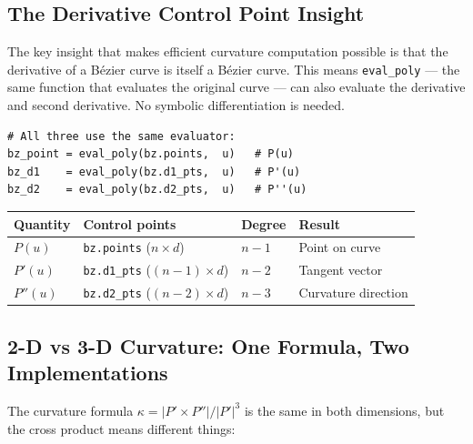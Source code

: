 \documentclass[12pt, a4paper]{article}
\newcommand{\cd}[1]{\texttt{#1}}
\begin{document}
\begin{center}
\end{center}

\subsection{The Derivative Control Point Insight}

The key insight that makes efficient curvature computation
possible is that the derivative of a B\'ezier curve is
itself a B\'ezier curve.
This means \cd{eval\_poly} --- the same function that
evaluates the original curve --- can also evaluate the
derivative and second derivative.
No symbolic differentiation is needed.

\begin{verbatim}
# All three use the same evaluator:
bz_point = eval_poly(bz.points,  u)   # P(u)
bz_d1    = eval_poly(bz.d1_pts,  u)   # P'(u)
bz_d2    = eval_poly(bz.d2_pts,  u)   # P''(u)
\end{verbatim}

\begin{center}
\begin{tabular}{llll}
\toprule
Quantity & Control points & Degree & Result \\
\midrule
$P(u)$ & \cd{bz.points} ($n\times d$) & $n-1$ &
  Point on curve \\
$P'(u)$ & \cd{bz.d1\_pts} ($(n-1)\times d$) & $n-2$ &
  Tangent vector \\
$P''(u)$ & \cd{bz.d2\_pts} ($(n-2)\times d$) & $n-3$ &
  Curvature direction \\
\bottomrule
\end{tabular}
\end{center}

\subsection{2-D vs 3-D Curvature: One Formula, Two Implementations}

The curvature formula $\kappa = |P' \times P''| / |P'|^3$
is the same in both dimensions, but the cross product
means different things:
\end{document}
